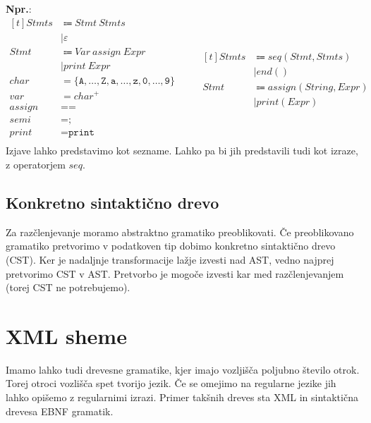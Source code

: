 \documentclass{report}
\newcommand{\Ex}{\textbf{Npr.}:\ }
\newcommand{\Null}{\varepsilon}
\newcommand{\Char}[1]{\texttt{#1}}
\newcommand{\Spc}{\ }
\newcommand{\Union}{\mathrel{|}}
\newcommand{\KleenePlus}[1]{#1^+}
\newcommand{\Arrow}{\Coloneq}
\newcommand{\NT}[1]{{#1}}
\newcommand{\T}[1]{{#1}}
\begin{document}
\Ex
\begin{equation*}
  \begin{aligned}[t]
    \NT{Stmts} &\Arrow \NT{Stmt} \Spc \NT{Stmts}\\
    &\Union \Null\\
    \NT{Stmt} &\Arrow \NT{Var} \Spc \T{assign} \Spc \NT{Expr}\\
    &\Union \T{print} \Spc \NT{Expr}\\[1em]
    \T{char} &= \{\Char{A}, \dots, \Char{Z}, \Char{a}, \dots, \Char{z}, \Char{0}, \dots, \Char{9} \}\\
    \T{var} &= \KleenePlus{\T{char}}\\
    \T{assign} &= \Char{=}\\
    \T{semi} &= \Char{;}\\
    \T{print} &= \Char{print}\\
  \end{aligned}
  \qquad
  \begin{aligned}[t]
    Stmts &\Arrow seq(Stmt, Stmts) \\
    &\Union end()\\
    Stmt &\Arrow assign(String, Expr) \\
    &\Union print(Expr)
  \end{aligned}
\end{equation*}
Izjave lahko predstavimo kot sezname. Lahko pa bi jih predstavili tudi kot izraze, z operatorjem $seq$.

\section{Konkretno sintaktično drevo}
Za razčlenjevanje moramo abstraktno gramatiko preoblikovati.
Če preoblikovano gramatiko pretvorimo v podatkoven tip dobimo konkretno sintaktično drevo (CST).
Ker je nadaljnje transformacije lažje izvesti nad AST, vedno najprej pretvorimo CST v AST.
Pretvorbo je mogoče izvesti kar med razčlenjevanjem (torej CST ne potrebujemo).

\chapter{XML sheme}

Imamo lahko tudi drevesne gramatike, kjer imajo vozljišča poljubno število otrok.
Torej otroci vozlišča spet tvorijo jezik.
Če se omejimo na regularne jezike jih lahko opišemo z regularnimi izrazi.
Primer takšnih dreves sta XML in sintaktična drevesa EBNF gramatik.
\end{document}
